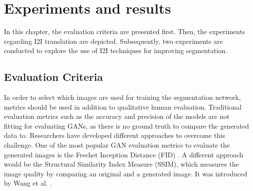 \chapter{Experiments and results}\label{result}
In this chapter, the evaluation criteria are presented first. 
Then, the experiments regarding I2I translation are depicted.
Subsequently, two experiments are conducted to explore the use of I2I techniques for improving segmentation.
\section{Evaluation Criteria}
In order to select which images are used for training the segmentation network, metrics should be used in addition to qualitative human evaluation.
Traditional evaluation metrics such as the accuracy and precision of the models are not fitting for evaluating GANs, as there is no ground truth to compare the generated data to.
Researchers have developed different approaches to overcome this challenge.
One of the most popular GAN evaluation metrics to evaluate the generated images is the Frechet Inception Distance (FID) \cite{alqahtani2019analysis}.
A different approach would be the Structural Similarity Index Measure (SSIM), which measures the image quality by comparing an original and a generated image. 
It was introduced by Wang et al. \cite{wang2004image}.
